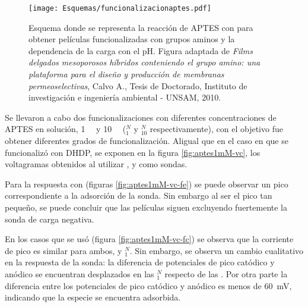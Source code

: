 				 \begin{figure}[h!]	
					\centering
			 	    \texttt{[image: Esquemas/funcionalizacionaptes.pdf]}
			        \caption[Funcionalización con APTES 1mM]{Esquema donde se representa la reacción de APTES con \pdmZ\space para obtener películas funcionalizadas con grupos aminos y la dependencia de la carga con el pH. Figura adaptada de \textit{Films delgados mesoporosos híbridos conteniendo el grupo amino: una plataforma para el diseño y producción de membranas permeoselectivas}, Calvo A., Tesis de Doctorado, Instituto de investigación e ingeniería ambiental - UNSAM, 2010.\cite{Calvo20210}}
			        \label{esq:aptes-esquema}
			      	\end{figure}

			\vspace*{3mm}Se llevaron a cabo dos funcionalizaciones con diferentes concentraciones de APTES en solución, \SI{1}{\milli\Molar} y \SI{10}{\milli\Molar} (\pdmZ$^N_{1}$ y \pdmZ$^N_{10}$ respectivamente), con el objetivo fue obtener diferentes grados de funcionalización\cite{Calvo20210,Angelome2008,Fuertes2010}. Al\space igual que en el caso en que se funcionalizó con DHDP, se exponen en la figura \ref{fig:aptes1mM-vc}, los voltagramas obtenidos al utilizar \fe, \fc\space y \ru\space como sondas.

			Para la respuesta con \fe\space (figuras \ref{fig:aptes1mM-vc-fe}) se puede observar un pico correspondiente a la adsorción de la sonda. Sin embargo al ser el pico tan pequeño, se puede concluir que las películas siguen excluyendo fuertemente la sonda de carga negativa.

			En los casos que se usó \fc\space (figura \ref{fig:aptes1mM-vc-fc}) se observa que la corriente de pico es similar para ambos, \pdmZ\space y \pdmZ$^N_1$. Sin embargo, se observa un cambio cualitativo en la respuesta de la sonda: la diferencia de potenciales de pico catódico y anódico se encuentran desplazados en las \pdmZ$^N_1$ respecto de las \pdmZ. Por otra parte la diferencia entre los potenciales de pico catódico y anódico es menos de \SI{60}{\milli\volt}, indicando que la especie se encuentra adsorbida. 

